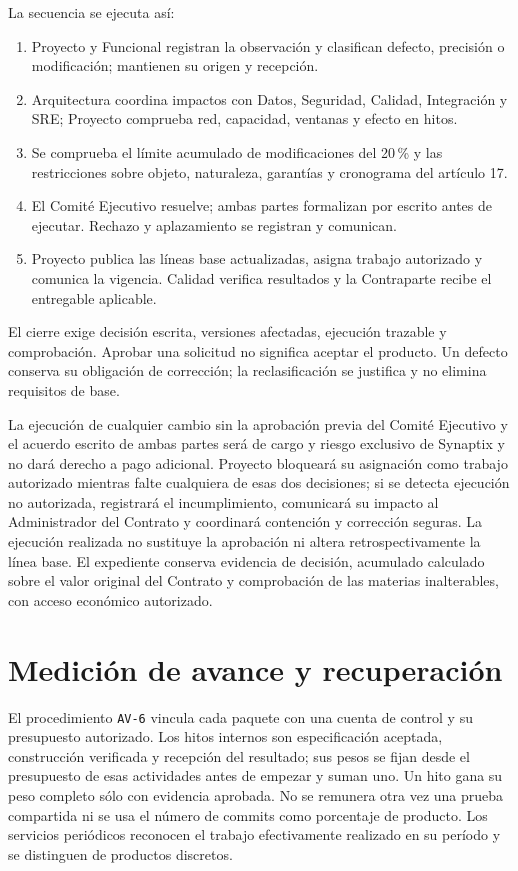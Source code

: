 La secuencia se ejecuta así:
\begin{enumerate}
\item Proyecto y Funcional registran la observación y clasifican defecto, precisión o modificación; mantienen su origen y recepción.
\item Arquitectura coordina impactos con Datos, Seguridad, Calidad, Integración y SRE; Proyecto comprueba red, capacidad, ventanas y efecto en hitos.
\item Se comprueba el límite acumulado de modificaciones del 20\,\% y las restricciones sobre objeto, naturaleza, garantías y cronograma del artículo 17.
\item El Comité Ejecutivo resuelve; ambas partes formalizan por escrito antes de ejecutar. Rechazo y aplazamiento se registran y comunican.
\item Proyecto publica las líneas base actualizadas, asigna trabajo autorizado y comunica la vigencia. Calidad verifica resultados y la Contraparte recibe el entregable aplicable.
\end{enumerate}
El cierre exige decisión escrita, versiones afectadas, ejecución trazable y comprobación. Aprobar una solicitud no significa aceptar el producto. Un defecto conserva su obligación de corrección; la reclasificación se justifica y no elimina requisitos de base.

La ejecución de cualquier cambio sin la aprobación previa del Comité Ejecutivo y el acuerdo escrito de ambas partes será de cargo y riesgo exclusivo de Synaptix y no dará derecho a pago adicional. Proyecto bloqueará su asignación como trabajo autorizado mientras falte cualquiera de esas dos decisiones; si se detecta ejecución no autorizada, registrará el incumplimiento, comunicará su impacto al Administrador del Contrato y coordinará contención y corrección seguras. La ejecución realizada no sustituye la aprobación ni altera retrospectivamente la línea base. El expediente conserva evidencia de decisión, acumulado calculado sobre el valor original del Contrato y comprobación de las materias inalterables, con acceso económico autorizado. \parencite[art.~72, numerales 1--5, p.~38]{sd6-ba}

\section{Medición de avance y recuperación}
El procedimiento \texttt{AV-6} vincula cada paquete con una cuenta de control y su presupuesto autorizado. Los hitos internos son especificación aceptada, construcción verificada y recepción del resultado; sus pesos se fijan desde el presupuesto de esas actividades antes de empezar y suman uno. Un hito gana su peso completo sólo con evidencia aprobada. No se remunera otra vez una prueba compartida ni se usa el número de commits como porcentaje de producto. Los servicios periódicos reconocen el trabajo efectivamente realizado en su período y se distinguen de productos discretos.

